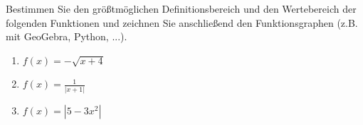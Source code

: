 \begin{ExerciseBlock}
Bestimmen Sie den größtmöglichen Definitionsbereich und den Wertebereich der folgenden Funktionen und zeichnen Sie anschließend den Funktionsgraphen (z.B. mit GeoGebra, Python, ...).
\begin{enumerate}[label=\alph*)]
\item $\displaystyle f(x)=-\sqrt{x+4}$
\item $\displaystyle f(x)=\frac{1}{|x+1|}$
\item $\displaystyle f(x)=|5-3x^2|$
\end{enumerate}

\end{ExerciseBlock}
